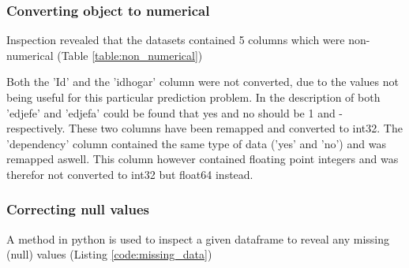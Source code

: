 \documentclass[preprint,12pt]{elsarticle}
\begin{document}
\subsubsection{Converting object to numerical}
\label{sss:conversion}
Inspection revealed that the datasets contained 5 columns which were non-numerical (Table \ref{table:non_numerical})\\

\begin{table}[]
\caption{Object types in the dataset}
\label{table:non_numerical}
\end{table}

Both the 'Id' and the 'idhogar' column were not converted, due to the values not being useful for this particular prediction problem. In the description of both 'edjefe' and 'edjefa' could be found that yes and no should be 1 and - respectively. These two columns have been remapped and converted to int32. The 'dependency' column contained the same type of data ('yes' and 'no') and was remapped aswell. This column however contained floating point integers and was therefor not converted to int32 but float64 instead.

\subsubsection{Correcting null values}
\label{sss:correct_null}
A method in python is used to inspect a given dataframe to reveal any missing (null) values (Listing \ref{code:missing_data})
\end{document}
